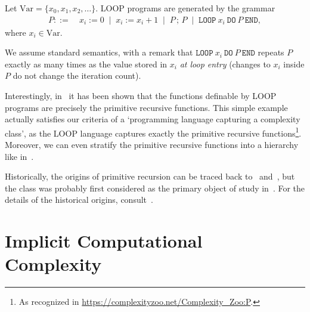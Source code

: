 \begin{definition}
Let \(\mathrm{Var}=\{x_0,x_1,x_2,\dots\}\).
LOOP programs are generated by the grammar
\[
\begin{aligned}
P ::=~& x_i := 0
\;\mid\; x_i := x_i + 1
\;\mid\; P \,;\, P
\;\mid\; \texttt{LOOP}~x_i~\texttt{DO}~P~\texttt{END},
\end{aligned}
\]
where \(x_i\in\mathrm{Var}\).

\noindent
We assume standard semantics, with a remark that \(\texttt{LOOP}~x_i~\texttt{DO}~P~\texttt{END}\) repeats \(P\) exactly as many times as the value stored in \(x_i\) \emph{at loop entry} (changes to \(x_i\) inside \(P\) do not change the iteration count).
\end{definition}

Interestingly, in~\cite{10.1145/800196.806014} it has been shown that the functions definable by LOOP programs
are precisely the primitive recursive functions.
This simple example actually satisfies our criteria of a `programming language capturing a complexity class', as
the LOOP language captures exactly the primitive recursive functions\footnote{As recognized in \url{https://complexityzoo.net/Complexity_Zoo:P}.}.
Moreover, we can even stratify the primitive recursive functions into a hierarchy like in~\cite{Grzegorczyk1953}.


Historically, the origins of primitive recursion can be traced back to~\cite{Grassmann1861} and~\cite{Dedekind1888},
but the class was probably first considered as the primary object of study in~\cite{Skolem1923-vanHeijenoort}.
For the details of the historical origins, consult~\cite{Adams2011}.

\section{Implicit Computational Complexity}


